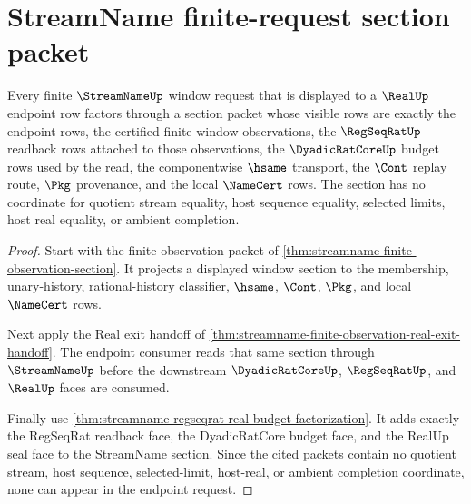 \section{StreamName finite-request section packet}
\label{sec:streamname-finite-request-section-packet}

\begin{theorem}
\label{thm:streamname-real-endpoint-finite-request-section}
Every finite $\StreamNameUp$ window request that is displayed to a $\RealUp$
endpoint row factors through a section packet whose visible rows are exactly
the endpoint rows, the certified finite-window observations, the
$\RegSeqRatUp$ readback rows attached to those observations, the
$\DyadicRatCoreUp$ budget rows used by the read, the componentwise $\hsame$
transport, the $\Cont$ replay route, $\Pkg$ provenance, and the local
$\NameCert$ rows. The section has no coordinate for quotient stream equality,
host sequence equality, selected limits, host real equality, or ambient
completion.
\end{theorem}
\begin{proof}
Start with the finite observation packet of
\autoref{thm:streamname-finite-observation-section}. It projects a displayed
window section to the membership, unary-history, rational-history classifier,
$\hsame$, $\Cont$, $\Pkg$, and local $\NameCert$ rows.

Next apply the Real exit handoff of
\autoref{thm:streamname-finite-observation-real-exit-handoff}. The endpoint
consumer reads that same section through $\StreamNameUp$ before the downstream
$\DyadicRatCoreUp$, $\RegSeqRatUp$, and $\RealUp$ faces are consumed.

Finally use
\autoref{thm:streamname-regseqrat-real-budget-factorization}. It adds exactly
the RegSeqRat readback face, the DyadicRatCore budget face, and the RealUp
seal face to the StreamName section. Since the cited packets contain no
quotient stream, host sequence, selected-limit, host-real, or ambient
completion coordinate, none can appear in the endpoint request.
\end{proof}

